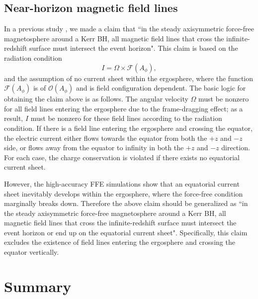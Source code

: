 \documentclass[aps,prd,reprint,nofootinbib, superscriptaddress]{revtex4-1}
\def\Ap{A_\phi}
\def\be{\begin{equation}}
\def\ee{\end{equation}}
\begin{document}
\subsection{Near-horizon magnetic field lines}
In a previous study \cite{Pan2016a}, we made a claim that ``in the steady axisymmetric force-free magnetosphere
around a Kerr BH, all magnetic field lines that cross the infinite-redshift surface must intersect the event horizon".
This claim is based on the radiation condition
\be
\label{eq:Grad}
I = \Omega \times \mathcal F(\Ap),
\ee
and the assumption of no current sheet within the ergosphere,
where the function $\mathcal F(\Ap)$ is of $\mathcal O(\Ap)$ and  is field configuration dependent.
The basic logic for obtaining the claim above is as follows.
The angular velocity $\Omega$ must be nonzero for all field lines entering the ergosphere due to the frame-dragging effect;
as a result, $I$ must be nonzero for these field lines according to the radiation condition.
If there is a field line entering the ergosphere and crossing the equator, the electric current either flows
towards the equator from both the $+z$ and $-z$ side, or flows away from the equator to infinity in
both the $+z$ and $-z$ direction. For each case, the charge conservation is violated
if there exists no equatorial current sheet.

However, the high-accuracy FFE simulations show that an equatorial current sheet inevitably develops within the ergosphere, where
the force-free condition marginally breaks down. Therefore the above claim should be generalized as
``in the steady axisymmetric force-free magnetosphere
around a Kerr BH, all magnetic field lines that cross the infinite-redshift surface
must intersect the event horizon or end up on the equatorial current sheet". Specifically,
this claim excludes the existence of field lines entering the ergosphere and crossing the
equator vertically.


\section{Summary}
\label{sec:summary}
\end{document}
